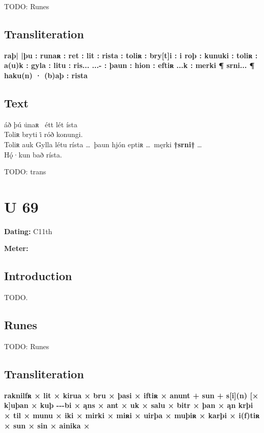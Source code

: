 TODO: Runes%

\subsection{Transliteration}

\textbf{raþ| |þu : runaʀ : ret : lit : rista : toliʀ : bry[t]i : i roþ : kunuki : toliʀ : a(u)k : gyla : litu : ris... ...- : þaun : hion : eftiʀ ...k : merki ¶ srni... ¶ haku(n) · (b)aþ : rista}

\subsection{Text}

\bpg\bpa[0]%
áð þú u̇naʀ \hld\ étt lét ísta \\
Toliʀ bryti i̇ róð konungi. \\
Toliʀ auk Gylla létu rísta \dots\ þaun hjón eptiʀ \dots\ męrki \textbf{†srni†} \dots \\
Hǫ́·kun bað rísta.\epa

\bpb TODO: trans\epb\epg

\sectionline\clearpage


\section{U 69}

\begin{flushright}%
\textbf{Dating:} C11th

\textbf{Meter:} \Fornyrdislag
\end{flushright}%

\subsection{Introduction}

TODO.

\subsection{Runes}

TODO: Runes%

\subsection{Transliteration}

\textbf{raknilfʀ × lit × kirua × bru × þasi × iftiʀ × anunt + sun + s[i](n) [× k]uþan × kuþ -{}-{}-bi × ąns × ant × uk × salu × bitr × þan × ąn krþi × til × munu × iki × mirki × miʀi × uirþa × muþiʀ × karþi × i(f)tiʀ × sun × sin × ainika ×}

